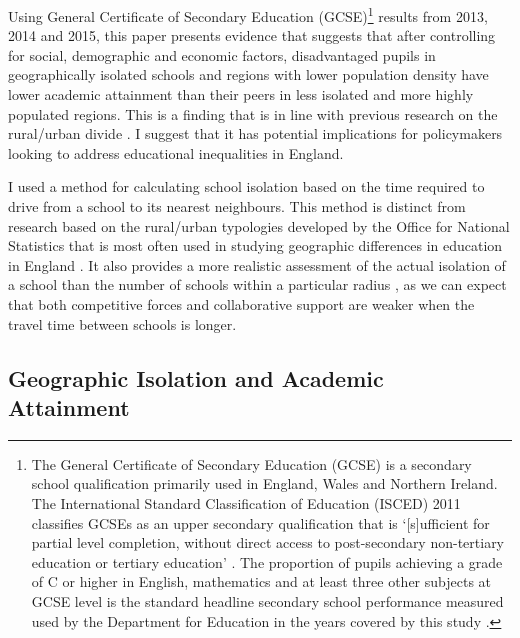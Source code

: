 \documentclass[12pt, a4paper]{article}
\begin{document}
Using General Certificate of Secondary Education (GCSE)\footnote{The General Certificate of Secondary Education (GCSE) is a secondary school qualification primarily used in England, Wales and Northern Ireland. The International Standard Classification of Education (ISCED) 2011 classifies GCSEs as an upper secondary qualification \autocites{unescoinstituteforstatistics2015} that is `[s]ufficient for partial level completion, without direct access to post-secondary non-tertiary education or tertiary education' \autocites[][42]{unescoinstituteforstatistics2012}. The proportion of pupils achieving a grade of C or higher in English, mathematics and at least three other subjects at GCSE level is the standard headline secondary school performance measured used by the Department for Education in the years covered by this study \autocites{departmentforeducation2014b, departmentforeducation2015b, departmentforeducation2016}.} results from 2013, 2014 and 2015, this paper presents evidence that suggests that after controlling for social, demographic and economic factors, disadvantaged pupils in geographically isolated schools and regions with lower population density have lower academic attainment than their peers in less isolated and more highly populated regions. This is a finding that is in line with previous research on the rural/urban divide \autocites{green2010, nationalcentreforsocialresearch2009, gibbons2008a}. I suggest that it has potential implications for policymakers looking to address educational inequalities in England.

I used a method for calculating school isolation based on the time required to drive from a school to its nearest neighbours. This method is distinct from research based on the rural/urban typologies developed by the Office for National Statistics \autocites{bibby2004} that is most often used in studying geographic differences in education in England \autocites[for example see][]{bynner2002, midouhas2015, nationalcentreforsocialresearch2009}. It also provides a more realistic assessment of the actual isolation of a school than the number of schools within a particular radius \autocites[such as the 2km radius used by][]{gibbons2008a}, as we can expect that both competitive forces and collaborative support are weaker when the travel time between schools is longer. 

\subsection{Geographic Isolation and Academic Attainment}
\end{document}
